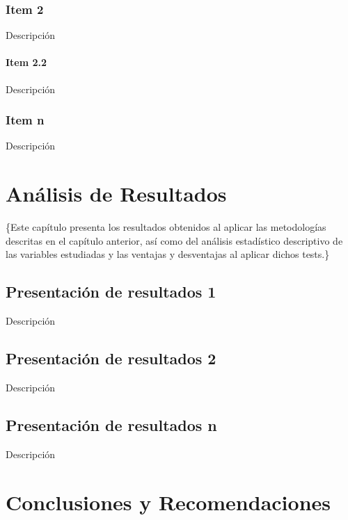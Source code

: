 \documentclass[oneside,11pt]{Latex/Classes/PhDthesisPSnPDF}
\begin{document}
\begin{table}[ht]
\subsection{Item 2}

Descripción\\

\subsubsection{Item 2.2}

Descripción\\

\subsection{Item n}

Descripción\\

\chapter{Análisis de Resultados}

\{\small Este capítulo presenta los resultados obtenidos al aplicar las
metodologías descritas en el capítulo anterior, así como del análisis
estadístico descriptivo de las variables estudiadas y las ventajas y
desventajas al aplicar dichos tests.\}

\section{Presentación de resultados 1}

Descripción\\

\section{Presentación de resultados 2}

Descripción\\

\section{Presentación de resultados n}

Descripción\\

\chapter{Conclusiones y Recomendaciones}


\end{table}
\end{document}
